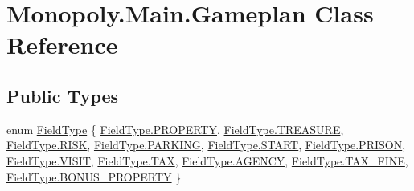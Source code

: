 \hypertarget{class_monopoly_1_1_main_1_1_gameplan}{}\section{Monopoly.\+Main.\+Gameplan Class Reference}
\label{class_monopoly_1_1_main_1_1_gameplan}
\subsection*{Public Types}
\begin{DoxyCompactItemize}
\item 
enum \mbox{\hyperlink{class_monopoly_1_1_main_1_1_gameplan_a460f9e6d576d65d9ad9fe2b291ee2344}{Field\+Type}} \{ \newline
\mbox{\hyperlink{class_monopoly_1_1_main_1_1_gameplan_a460f9e6d576d65d9ad9fe2b291ee2344a77bc4ffc1b6dce554d9dda5d6dea1660}{Field\+Type.\+P\+R\+O\+P\+E\+R\+TY}}, 
\mbox{\hyperlink{class_monopoly_1_1_main_1_1_gameplan_a460f9e6d576d65d9ad9fe2b291ee2344af2de7bf382e8eaf7b82632f3c91002f5}{Field\+Type.\+T\+R\+E\+A\+S\+U\+RE}}, 
\mbox{\hyperlink{class_monopoly_1_1_main_1_1_gameplan_a460f9e6d576d65d9ad9fe2b291ee2344aea03e4b16909efe369d688a1636c27bc}{Field\+Type.\+R\+I\+SK}}, 
\mbox{\hyperlink{class_monopoly_1_1_main_1_1_gameplan_a460f9e6d576d65d9ad9fe2b291ee2344ab1e1c47120e5bf1a41614bc7f95a80db}{Field\+Type.\+P\+A\+R\+K\+I\+NG}}, 
\newline
\mbox{\hyperlink{class_monopoly_1_1_main_1_1_gameplan_a460f9e6d576d65d9ad9fe2b291ee2344ab078ffd28db767c502ac367053f6e0ac}{Field\+Type.\+S\+T\+A\+RT}}, 
\mbox{\hyperlink{class_monopoly_1_1_main_1_1_gameplan_a460f9e6d576d65d9ad9fe2b291ee2344a3b9336e11e62de8c12854167e3dacbc0}{Field\+Type.\+P\+R\+I\+S\+ON}}, 
\mbox{\hyperlink{class_monopoly_1_1_main_1_1_gameplan_a460f9e6d576d65d9ad9fe2b291ee2344ae5b24420409496253651e101b2b6d241}{Field\+Type.\+V\+I\+S\+IT}}, 
\mbox{\hyperlink{class_monopoly_1_1_main_1_1_gameplan_a460f9e6d576d65d9ad9fe2b291ee2344ad2fd56af1734653a658babb6422a8e40}{Field\+Type.\+T\+AX}}, 
\newline
\mbox{\hyperlink{class_monopoly_1_1_main_1_1_gameplan_a460f9e6d576d65d9ad9fe2b291ee2344a984048c6ac8594605cc87d76df7b1cd8}{Field\+Type.\+A\+G\+E\+N\+CY}}, 
\mbox{\hyperlink{class_monopoly_1_1_main_1_1_gameplan_a460f9e6d576d65d9ad9fe2b291ee2344a111327053b84aea2ab14c7f4d7d11705}{Field\+Type.\+T\+A\+X\+\_\+\+F\+I\+NE}}, 
\mbox{\hyperlink{class_monopoly_1_1_main_1_1_gameplan_a460f9e6d576d65d9ad9fe2b291ee2344ac119e3455ca53878e4aab56c64932a7b}{Field\+Type.\+B\+O\+N\+U\+S\+\_\+\+P\+R\+O\+P\+E\+R\+TY}}
 \}
\end{DoxyCompactItemize}
